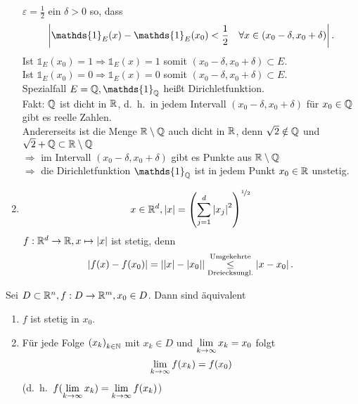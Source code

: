 \documentclass[../ana1.tex]{subfiles}
\begin{document}
\begin{bspe}
\begin{enumerate}
        \( \varepsilon = \frac{1}{2} \) ein \(\delta > 0\) so, dass
        \[ \abs{ \mathds{1}_E(x) - \mathds{1}_E(x_0) < \frac{1}{2} 
        \quad \forall x\in (x_0 - \delta, x_0 + \delta) }. \]
        Ist \( \mathds{1}_E(x_0) = 1 \Rightarrow \mathds{1}_E(x) = 1 \)
        somit \( (x_0 - \delta, x_0 + \delta) \subset E \).\\
        Ist \( \mathds{1}_E(x_0) = 0 \Rightarrow \mathds{1}_E(x) = 0 \)
        somit \( (x_0 - \delta, x_0 + \delta) \subset E \).\\
        Spezialfall \( E = \Q, \mathds{1}_\Q \) heißt Dirichletfunktion.\\
        Fakt: \( \mathbb{Q} \) ist dicht in \( \mathbb{R} \), d.\ h.\ in jedem Intervall
        \( (x_0 - \delta, x_0 + \delta) \) für \( x_0 \in\mathbb{Q} \) gibt es
        reelle Zahlen.\\
        Andererseits ist die Menge \( \mathbb{R}\setminus\mathbb{Q} \) auch dicht in \(\mathbb{R} \), 
        denn \( \sqrt{2} \notin \mathbb{Q} \) und \( \sqrt{2}+\mathbb{Q} \subset \mathbb{R}\setminus\mathbb{Q} \) \\
        \( \Rightarrow \) im Intervall \( (x_0 - \delta, x_0 + \delta) \)
        gibt es Punkte aus \( \mathbb{R}\setminus\mathbb{Q} \) \\
        \( \Rightarrow \) die Dirichletfunktion \( \mathds{1}_\Q \) ist
        in jedem Punkt \( x_0 \in\mathbb{R} \) unstetig.
        \item \[ x\in \mathbb{R}^d, \left|x\right| = 
        {\left( \sum_{j=1}^d \left|x_j\right|^2 \right)}^{\nicefrac{1}{2}} \]
        \( f:\mathbb{R}^d \rightarrow \mathbb{R}, x\mapsto \left|x\right| \) ist stetig, denn
        \[ \left| f(x) - f(x_0) \right| = \left| \left|x\right| - \left|x_0\right| \right| 
        \overset{\text{Umgekehrte}}{\underset{\text{Dreiecksungl.}}{\leq}} \left|x - x_0\right|. \]
    \end{enumerate}
\end{bspe}
\begin{satz}
    Sei \( D\subset \mathbb{R}^n, f:D\rightarrow \mathbb{R}^m, x_0 \in D \). Dann sind
    äquivalent
    \begin{enumerate}
        \item \( f \) ist stetig in \( x_0 \).
        \item Für jede Folge \( {(x_k)}_{k\in\mathbb{N}} \) mit \( x_k \in D \)
        und \( \lim\limits_{k\rightarrow\infty} x_k = x_0 \) folgt 
        \[ \lim\limits_{k\rightarrow\infty} f(x_k) = f(x_0) \]
        (d.\ h.\  \( f(\lim\limits_{k\rightarrow\infty} x_k) = \lim\limits_{k\rightarrow\infty} f(x_k) \))
    \end{enumerate}
\end{satz}
\end{document}
